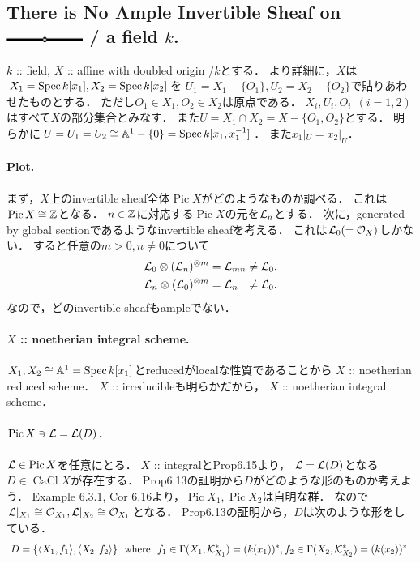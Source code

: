 \documentclass[a4paper]{jsarticle}
\newcommand{\CaCl}{\operatorname{CaCl}}
\newcommand{\Pic}{\operatorname{Pic}}
\begin{document}
    \subsection{There is No Ample Invertible Sheaf on 
        \protect\includegraphics[width=2.5cm]{./images/affine_with_doubled_origin2.eps} / a field $k$.}
    $k$ :: field,
    $X$ :: affine with doubled origin /$k$とする．
    より詳細に，$X$は$X_1=\operatorname{Spec} k[x_1], X_2=\operatorname{Spec} k[x_2]$を
    $U_1=X_1-\{O_1\}, U_2=X_2-\{O_2\}$で貼りあわせたものとする．
    ただし$O_1 \in X_1,O_2 \in X_2$は原点である．
    $X_i, U_i, O_i ~~(i=1,2)$はすべて$X$の部分集合とみなす．
    また$U=X_1 \cap X_2=X-\{O_1, O_2\}$とする．
    明らかに$U=U_1=U_2 \cong \mathbb{A}^1-\{0\}=\operatorname{Spec} k[x_1, x_1^{-1}]$．
    また$x_1|_U=x_2|_U$．

    \paragraph{Plot.}
    まず，$X$上のinvertible sheaf全体$\Pic X$がどのようなものか調べる．
    これは$\Pic X \iso \Z$となる．
    $n \in \mathbb{Z}$に対応する$\Pic X$の元を$\mathcal{L}_n$とする．
    次に，generated by global sectionであるようなinvertible sheafを考える．
    これは$\mathcal{L}_0(=\mathcal{O}_X)$しかない．
    すると任意の$m>0, n \neq 0$について
    \begin{align*}
        \mathcal{L}_0 \otimes (\mathcal{L}_n)^{\otimes m} &= \mathcal{L}_{mn} \neq \mathcal{L}_0. \\
        \mathcal{L}_n \otimes (\mathcal{L}_0)^{\otimes m} &= \mathcal{L}_n \hspace{7pt}\neq \mathcal{L}_0.
    \end{align*}
    なので，どのinvertible sheafもampleでない．

    \paragraph{$X$ :: noetherian integral scheme.}
    $X_1, X_2 \cong \mathbb{A}^1=\operatorname{Spec} k[x_1]$とreducedがlocalな性質であることから
    $X$ :: noetherian reduced scheme．
    $X$ :: irreducibleも明らかだから，
    $X$ :: noetherian integral scheme．

    \paragraph{$\Pic X \ni \shL=\shL(D)$.}
    $\shL \in \Pic X$を任意にとる．
    $X$ :: integralとProp6.15より，
    $\mathcal{L}=\mathcal{L}(D)$となる$D \in \CaCl X$が存在する．
    Prop6.13の証明から$D$がどのような形のものか考えよう．
    Example 6.3.1, Cor 6.16より，$\Pic X_1, \Pic X_2$は自明な群．
    なので$\mathcal{L}|_{X_1} \cong \mathcal{O}_{X_1}, \mathcal{L}|_{X_2} \cong \mathcal{O}_{X_1}$となる．
    Prop6.13の証明から，$D$は次のような形をしている．
    \[
        D=\{ \langle X_1,f_1 \rangle, \langle X_2,f_2 \rangle \}
        ~~\text{where}~~
        f_1 \in \Gamma(X_1, \mathcal{K}_{X_1}^*)=(k(x_1))^*,
        f_2 \in \Gamma(X_2, \mathcal{K}_{X_2}^*)=(k(x_2))^*.
    \]
\end{document}
